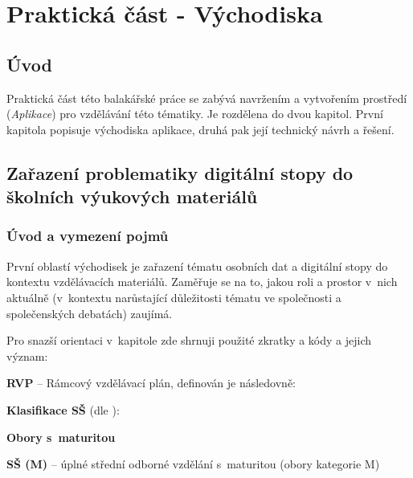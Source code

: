 \chapter{Praktická část - Východiska}

\section*{Úvod}
Praktická část této balakářské práce se zabývá navržením a vytvořením prostředí (\textit{Aplikace}) pro vzdělávání této tématiky.
Je rozdělena do dvou kapitol. První kapitola popisuje východiska aplikace, druhá pak její technický návrh a řešení.

\section{Zařazení problematiky digitální stopy do školních výukových materiálů}

\subsection*{Úvod a vymezení pojmů}

První oblastí východisek je zařazení tématu osobních dat a digitální stopy do kontextu vzdělávacích materiálů.
Zaměřuje se na to, jakou roli a prostor v~nich aktuálně (v~kontextu narůstající důležitosti tématu ve společnosti a společenských debatách) zaujímá.

Pro snazší orientaci v~kapitole zde shrnuji použité zkratky a kódy a jejich význam:

\textbf{RVP} -- Rámcový vzdělávací plán, definován \citep{rvp} je následovně:

\begin{displayquote}
 \citep{rvp} 
\end{displayquote}

\textbf{Klasifikace SŠ} (dle \citep{stredni-vzdelavani}):

\textbf{Obory s~maturitou}

\textbf{SŠ (M)} -- úplné střední odborné vzdělání s~maturitou (obory kategorie M)

